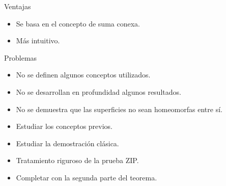 \documentclass{beamer}
\theoremstyle{definition}
\begin{document}
\begin{frame}
\begin{block}{Ventajas}
\begin{itemize}
\item Se basa en el concepto de suma conexa.
\item  Más intuitivo.\pause
\end{itemize}
\end{block}

\begin{block}{Problemas}

\begin{itemize}
\item No se definen algunos conceptos utilizados. 
\item No se desarrollan en profundidad algunos resultados.
\item No se demuestra que las superficies no sean homeomorfas entre sí. 
\end{itemize}
\end{block}

\end{frame}

\begin{frame}

\begin{itemize}
\frametitle{Trabajo}
\item Estudiar los conceptos previos.
\item Estudiar la demostración clásica.
\item Tratamiento riguroso de la prueba ZIP.
\item Completar con la segunda parte del teorema.
\end{itemize}
\end{frame}
\end{document}
